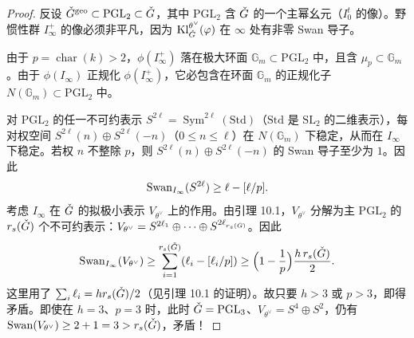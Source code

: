 \begin{proof}
反设 $\check G^{\mathrm{geo}}\subset\mathrm{PGL}_2\subset\check G$，其中 $\mathrm{PGL}_2$ 含 $\check G$ 的一个主幂幺元（$I^t_0$ 的像）。野惯性群 $I^+_\infty$ 的像必须非平凡，因为 $\mathrm{Kl}^{\theta^\vee}_{\check G}(\varphi)$ 在 $\infty$ 处有非零 Swan 导子。

由于 $p=\operatorname{char}(k)>2$，$\phi(I^+_\infty)$ 落在极大环面 $\mathbb{G}_m\subset\mathrm{PGL}_2$ 中，且含 $\mu_p\subset\mathbb{G}_m$。由于 $\phi(I_\infty)$ 正规化 $\phi(I^+_\infty)$，它必包含在环面 $\mathbb{G}_m$ 的正规化子 $N(\mathbb{G}_m)\subset\mathrm{PGL}_2$ 中。

对 $\mathrm{PGL}_2$ 的任一不可约表示 $S^{2\ell}=\operatorname{Sym}^{2\ell}(\mathrm{Std})$（$\mathrm{Std}$ 是 $\mathrm{SL}_2$ 的二维表示），每对权空间 $S^{2\ell}(n)\oplus S^{2\ell}(-n)$（$0\le n\le\ell$）在 $N(\mathbb{G}_m)$ 下稳定，从而在 $I_\infty$ 下稳定。若权 $n$ 不整除 $p$，则 $S^{2\ell}(n)\oplus S^{2\ell}(-n)$ 的 Swan 导子至少为 $1$。因此
\[
\mathrm{Swan}_{I_\infty}(S^{2\ell})\ge\ell-[\ell/p].
\]
考虑 $I_\infty$ 在 $\check G$ 的拟极小表示 $V_{\theta^\vee}$ 上的作用。由引理 10.1，$V_{\theta^\vee}$ 分解为主 $\mathrm{PGL}_2$ 的 $r_s(\check G)$ 个不可约表示：$V_{\theta^\vee}=S^{2\ell_1}\oplus\cdots\oplus S^{2\ell_{r_s(\check G)}}$。因此
\[
\mathrm{Swan}_{I_\infty}(V_{\theta^\vee})\ge\sum_{i=1}^{r_s(\check G)}(\ell_i-[\ell_i/p])\ge\Big(1-\frac1p\Big)\frac{h\,r_s(\check G)}{2}.
\]
这里用了 $\sum_i\ell_i=hr_s(\check G)/2$（见引理 10.1 的证明）。故只要 $h>3$ 或 $p>3$，即得矛盾。即使在 $h=3$、$p=3$ 时，此时 $\check G=\mathrm{PGL}_3$、$V_{\theta^\vee}=S^4\oplus S^2$，仍有 $\mathrm{Swan}(V_{\theta^\vee})\ge 2+1=3>r_s(\check G)$，矛盾！
\end{proof}

